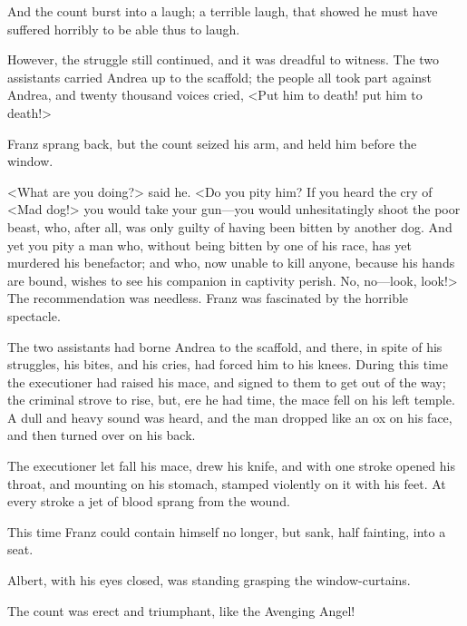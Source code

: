  And the count burst into a laugh; a terrible laugh, that showed he must have suffered horribly to be able thus to laugh. 

 However, the struggle still continued, and it was dreadful to witness. The two assistants carried Andrea up to the scaffold; the people all took part against Andrea, and twenty thousand voices cried, <Put him to death! put him to death!> 

 Franz sprang back, but the count seized his arm, and held him before the window. 

 <What are you doing?> said he. <Do you pity him? If you heard the cry of <Mad dog!> you would take your gun—you would unhesitatingly shoot the poor beast, who, after all, was only guilty of having been bitten by another dog. And yet you pity a man who, without being bitten by one of his race, has yet murdered his benefactor; and who, now unable to kill anyone, because his hands are bound, wishes to see his companion in captivity perish. No, no—look, look!>  The recommendation was needless. Franz was fascinated by the horrible spectacle. 

 The two assistants had borne Andrea to the scaffold, and there, in spite of his struggles, his bites, and his cries, had forced him to his knees. During this time the executioner had raised his mace, and signed to them to get out of the way; the criminal strove to rise, but, ere he had time, the mace fell on his left temple. A dull and heavy sound was heard, and the man dropped like an ox on his face, and then turned over on his back. 

 The executioner let fall his mace, drew his knife, and with one stroke opened his throat, and mounting on his stomach, stamped violently on it with his feet. At every stroke a jet of blood sprang from the wound. 

 This time Franz could contain himself no longer, but sank, half fainting, into a seat. 

 Albert, with his eyes closed, was standing grasping the window-curtains. 

 The count was erect and triumphant, like the Avenging Angel! 